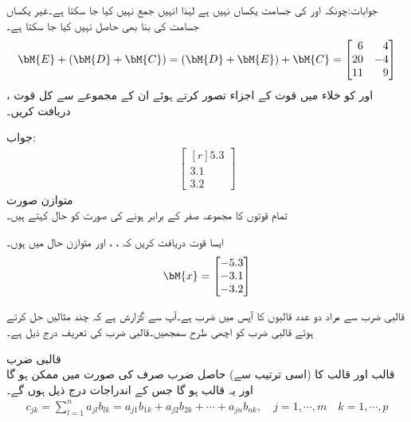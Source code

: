 جوابات:چونکہ  اور  کی جسامت یکساں نہیں ہے لہٰذا انہیں جمع نہیں کیا جا سکتا ہے۔غیر یکساں جسامت کی بنا  بھی حاصل نہیں کیا جا سکتا ہے۔ 
\begin{align*}
\bM{E}+(\bM{D}+\bM{C})=(\bM{D}+\bM{E})+\bM{C}=
\begin{bmatrix*}[r]
6&4\\
20&-4\\
11&9
\end{bmatrix*}
\end{align*}
،  اور  کو خلاء میں قوت کے اجزاء تصور کرتے ہوئے ان کے مجموعے سے کل قوت دریافت کریں۔

جواب:
\begin{align*}
\begin{bmatrix*}[r]
5.3\\
3.1\\
3.2
\end{bmatrix*}
\end{align*}
\quad متوازن صورت\\
تمام قوتوں کا مجموعہ صفر کے برابر ہونے کی صورت کو  حال کہتے ہیں۔

ایسا قوت  دریافت کریں کہ ، ،  اور  متوازن حال میں ہوں۔ 
\begin{align*}
\bM{x}=
\begin{bmatrix*}[r]
-5.3\\
-3.1\\
-3.2
\end{bmatrix*}
\end{align*}

قالبی ضرب سے مراد دو عدد قالبوں کا آپس میں ضرب ہے۔آپ سے گزارش ہے کہ  چند مثالیں حل کرتے ہوئے قالبی ضرب کو اچھی طرح سمجھیں۔قالبی ضرب کی تعریف درج ذیل ہے۔

\quad قالبی ضرب\\
 قالب  اور  قالب  کا (اسی ترتیب سے) حاصل ضرب  صرف  کی صورت میں ممکن ہو گا اور یہ  قالب  ہو گا جس کے اندراجات درج ذیل ہوں گے۔
\begin{align}\label{مساوات_الجبرائی_قالبی_ضرب_الف}
c_{jk}=\sum_{l=1}^{n} a_{jl}b_{lk}=a_{j1}b_{1k}+a_{j2}b_{2k}+\cdots+a_{jn}b_{nk},\quad j=1,\cdots,m \quad k=1,\cdots,p
\end{align}

